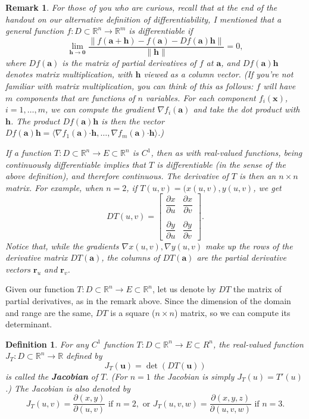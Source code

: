 \documentclass[12pt,letterpaper]{article}
\newtheorem{rem}[theorem]{Remark}
\newenvironment{remark}{\begin{rem}\rm}{\end{rem}}
\newtheorem{definition}[theorem]{Definition}
\newcommand{\R}{\mathbb{R}}
\newcommand{\x}{\mathbf{x}}
\newcommand{\uu}{\mathbf{u}}
\newcommand{\h}{\mathbf{h}}
\newcommand{\aaa}{\mathbf{a}}
\renewcommand{\r}{\mathbf{r}}
\newcommand{\dotp}{\boldsymbol{\cdot}}
\begin{document}
\begin{remark}
For those of you who are curious, recall that at the end of the handout on our alternative definition of differentiability, I mentioned that a general function $f:D\subset \R^n\to\R^m$ is {\em differentiable} if
\[
\lim_{\h\to\mathbf{0}}\frac{\lVert f(\aaa+\h)-f(\aaa)-Df(\aaa)\h\rVert}{\lVert\h\rVert}=0,
\]
where $Df(\aaa)$ is the matrix of partial derivatives of $f$ at $\aaa$, and $Df(\aaa)\h$ denotes matrix multiplication, with $\h$ viewed as a column vector. (If you're not familiar with matrix multiplication, you can think of this as follows: $f$ will have $m$ components that are functions of $n$ variables. For each component $f_i(\x)$, $i=1,\ldots, m$, we can compute the gradient $\nabla f_i(\aaa)$ and take the dot product with $\h$. The product $Df(\aaa)\h$ is then the vector $Df(\aaa)\h = \langle \nabla f_1(\aaa)\dotp \h,\ldots, \nabla f_m(\aaa)\dotp\h\rangle$.)

If a function $T:D\subset\R^n\to E\subset \R^n$ is $C^1$, then as with real-valued functions, being continuously differentiable implies that $T$ is differentiable (in the sense of the above definition), and therefore continuous. The derivative of $T$ is then an $n\times n$ matrix. For example, when $n=2$, if $T(u,v) = (x(u,v), y(u,v)$, we get
\[
DT(u,v) = \begin{bmatrix}
\dfrac{\partial x}{\partial u}& \dfrac{\partial x}{\partial v}\\ & \\ \dfrac{\partial y}{\partial u}&\dfrac{\partial y}{\partial v}
\end{bmatrix}.
\]
Notice that, while the gradients $\nabla x(u,v), \nabla y(u,v)$ make up the rows of the derivative matrix $DT(\aaa)$, the {\em columns} of $DT(\aaa)$ are the partial derivative vectors $\r_u$ and $\r_v$.
\end{remark}
Given our function $T:D\subset \R^n\to E\subset \R^n$, let us denote by $DT$ the matrix of partial derivatives, as in the remark above. Since the dimension of the domain and range are the same, $DT$ is a square ($n\times n$) matrix, so we can compute its determinant.
\begin{definition}
For any $C^1$ function $T:D\subset \R^n\to E\subset R^n$, the real-valued function $J_T:D\subset \R^n\to \R$ defined by
\[
J_T(\uu) = \det (DT(\uu))
\]
is called the {\bf Jacobian} of $T$. (For $n=1$ the Jacobian is simply $J_T(u)=T'(u)$.) The Jacobian is also denoted by
\[
J_T(u,v) = \frac{\partial(x,y)}{\partial (u,v)}\text{ if } n=2, \text{ or } J_T(u,v,w) = \frac{\partial (x,y,z)}{\partial (u,v,w)} \text{ if } n=3.
\]
\end{definition}
\end{document}
